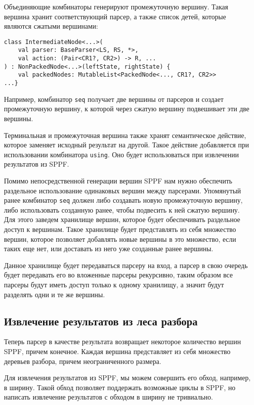 Объединяющие комбинаторы генерируют промежуточную вершину. Такая вершина хранит соответствующий парсер, а также список детей, которые являются сжатыми вершинами:

\begin{nobreaks}
\begin{lstlisting}
class IntermediateNode<...>(
    val parser: BaseParser<LS, RS, *>, 
    val action: (Pair<CR1?, CR2>) -> R, ...
) : NonPackedNode<...>(leftState, rightState) {
    val packedNodes: MutableList<PackedNode<..., CR1?, CR2>>
...}
\end{lstlisting}
\end{nobreaks}

Например, комбинатор \texttt{seq} получает две вершины от парсеров и создает промежуточную вершину, к которой через сжатую вершину подвешивает эти две вершины. 

Терминальная и промежуточная вершина также хранят семантическое действие, которое заменяет исходный результат на другой. Такое действие добавляется при использовании комбинатора \texttt{using}. Оно будет использоваться при извлечении результатов из SPPF.

Помимо непосредственной генерации вершин SPPF нам нужно обеспечить раздельное использование одинаковых вершин между парсерами. Упомянутый ранее комбинатор \texttt{seq} должен либо создавать новую промежуточную вершину, либо использовать созданную ранее, чтобы подвесить к ней сжатую вершину. Для этого заведем хранилище вершин, которое будет обеспечивать раздельное доступ к вершинам. Такое хранилище будет представлять из себя множество вершин, которое позволяет добавлять новые вершины в это множество, если таких еще нет, или доставать из него уже созданные ранее вершины. 

Данное хранилище будет передаваться парсеру на вход, а парсер в свою очередь будет передавать его во вложенные парсеры рекурсивно, таким образом все парсеры будут иметь доступ только к одному хранилищу, а значит будут разделять одни и те же вершины. 

\subsection{Извлечение результатов из леса разбора}

Теперь парсер в качестве результата возвращает некоторое количество вершин SPPF, причем конечное. Каждая вершина представляет из себя множество деревьев разбора, причем неограниченного размера.

Для извлечения результатов из SPPF, мы можем совершить его обход, например, в ширину. Такой обход позволяет поддержать возможные циклы в SPPF, но написать извлечение результатов с обходом в ширину не тривиально.

